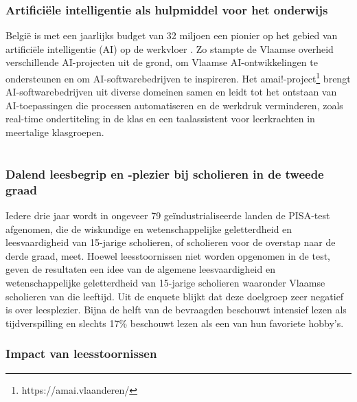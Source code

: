 \subsubsection{Artificiële intelligentie als hulpmiddel voor het onderwijs}

België is met een jaarlijks budget van 32 miljoen een pionier op het gebied van artificiële intelligentie (AI) op de werkvloer \autocite{Crevits2022}. Zo stampte de Vlaamse overheid verschillende AI-projecten uit de grond, om Vlaamse AI-ontwikkelingen te ondersteunen en om AI-softwarebedrijven te inspireren. Het amai!-project\footnote{https://amai.vlaanderen/} brengt AI-softwarebedrijven uit diverse domeinen samen en leidt tot het ontstaan van AI-toepassingen die processen automatiseren en de werkdruk verminderen, zoals real-time ondertiteling in de klas en een taalassistent voor leerkrachten in meertalige klasgroepen.


\section{}%
\label{sec:probleemstelling}

\subsubsection{Dalend leesbegrip en -plezier bij scholieren in de tweede graad}

Iedere drie jaar wordt in ongeveer 79 geïndustrialiseerde landen de PISA-test afgenomen, die de wiskundige en wetenschappelijke geletterdheid en leesvaardigheid van 15-jarige scholieren, of scholieren voor de overstap naar de derde graad, meet. Hoewel leesstoornissen niet worden opgenomen in de test, geven de resultaten een idee van de algemene leesvaardigheid en wetenschappelijke geletterdheid van 15-jarige scholieren waaronder Vlaamse scholieren van die leeftijd. Uit de enquete blijkt dat deze doelgroep zeer negatief is over leesplezier. Bijna de helft van de bevraagden beschouwt intensief lezen als tijdverspilling en slechts 17\% beschouwt lezen als een van hun favoriete hobby's.

\subsubsection{Impact van leesstoornissen}

